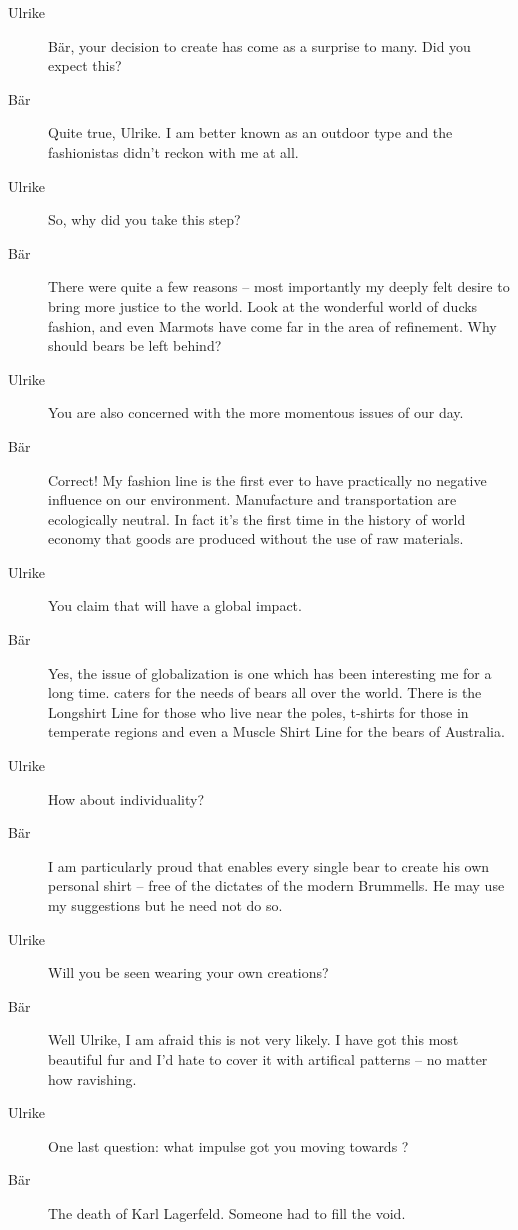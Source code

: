  \begin{description}
 \item[Ulrike]
  Bär, your decision to create \bearwearlogo{} has come as a surprise to many. Did you expect this?
  \item[Bär] Quite true, Ulrike. I am better known as an outdoor type
  and the fashionistas didn't reckon with me at all.
 \item[Ulrike] So, why did you take this step?
 \item[Bär] There were quite a few reasons -- most importantly
 my deeply felt desire to bring more justice to the world.
 Look at the wonderful world of \TikZ ducks fashion, and even Marmots have come
 far in the area of refinement. Why should \TikZ bears be left behind?
 \item[Ulrike] You are also concerned with the more momentous issues of our day.
 \item[Bär] Correct! My fashion line is the first ever to have practically
 no negative influence on our environment. Manufacture and transportation
 are ecologically neutral. In fact it's the first time in the
 history of world economy that goods are produced without
 the use of raw materials.
 \item[Ulrike] You claim that \bearwearlogo{} will have a global impact.
 \item[Bär] Yes, the issue of globalization is one which has been interesting
  me for a long time. \bearwearlogo{} caters for the needs of \TikZ bears all
  over the world. There is the Longshirt Line for those who live near the poles,
  t-shirts for those in temperate regions and even a Muscle Shirt Line for the
  bears of Australia.
 \item[Ulrike] How about individuality?
 \item[Bär] I am particularly proud that \bearwearlogo{} enables every single
 bear to create his own personal shirt -- free of the dictates of the modern
 Brummells. He may use my suggestions but he need not do so.
 \item[Ulrike] Will you be seen wearing your own creations?
 \item[Bär] Well Ulrike, I am afraid this is not very likely.
 I have got this most beautiful fur and I'd hate to  cover it with artifical
 patterns -- no matter how ravishing.
 \item[Ulrike] One last question: what impulse got you moving towards
 \bearwearlogo{}?
 \item[Bär] The death of Karl Lagerfeld. Someone had to fill the void.
 \end{description}